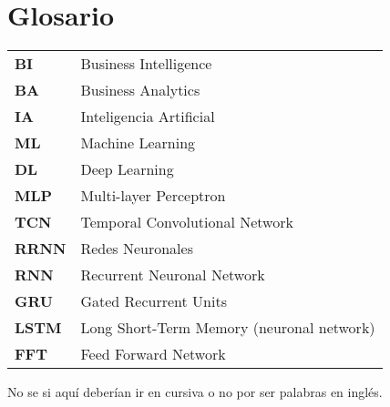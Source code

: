 \newpage

\thispagestyle{fancy}

\section*{Glosario}
\begin{longtable}{l p{13.7cm}}
\textbf{BI}   &  Business Intelligence  \\
\textbf{BA}   &  Business Analytics \\
\textbf{IA}   &  Inteligencia Artificial  \\
\textbf{ML}   &  Machine  Learning  \\
\textbf{DL}   &  Deep Learning  \\
\textbf{MLP}  &  Multi-layer Perceptron  \\
\textbf{TCN}  &  Temporal Convolutional Network  \\
\textbf{RRNN} &  Redes Neuronales  \\
\textbf{RNN}  &  Recurrent Neuronal Network  \\
\textbf{GRU}  &  Gated Recurrent Units  \\
\textbf{LSTM} &  Long Short-Term Memory (neuronal network)  \\
\textbf{FFT} &  Feed Forward Network  \\
\end{longtable}

\begin{atencion}
    No se si aquí deberían ir en cursiva o no por ser palabras en inglés.
\end{atencion}